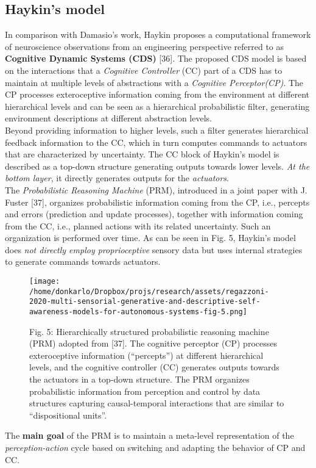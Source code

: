 \documentclass{article}
\begin{document}
		\subsection{Haykin’s model}
		In comparison with Damasio’s work, Haykin proposes a computational framework of neuroscience observations from an engineering perspective referred to as \textbf{Cognitive Dynamic
		Systems (CDS)} [36]. The proposed CDS model is based on the interactions that a \emph{Cognitive Controller} (CC) part of a CDS has to maintain at multiple levels of abstractions with a \emph{Cognitive Perceptor(CP)}.  The CP processes exteroceptive information coming from the environment at different hierarchical levels and can be seen as a hierarchical probabilistic filter, generating environment descriptions at different abstraction levels.
		\\
		Beyond providing information to higher levels, such a filter generates hierarchical feedback information to the CC, which in turn computes commands to actuators that are characterized
		by uncertainty. The CC block of Haykin’s model is described as a top-down structure generating outputs towards lower levels. \emph{At the bottom layer}, it directly generates outputs for
		the \emph{actuators}.
		\\
		The \emph{Probabilistic Reasoning Machine} (PRM), introduced in a joint paper with J. Fuster [37], organizes probabilistic information coming from the CP, i.e., percepts and errors (prediction and update processes), together with information coming from the CC, i.e., planned actions with its related
		uncertainty. Such an organization is performed over time. As can be seen in Fig. 5, Haykin’s model does \emph{not directly employ proprioceptive} sensory data but uses internal strategies
		to generate commands towards actuators.
		\begin{figure*}
			\centering
			\texttt{[image: /home/donkarlo/Dropbox/projs/research/assets/regazzoni-2020-multi-sensorial-generative-and-descriptive-self-awareness-models-for-autonomous-systems-fig-5.png]}
			\caption{Fig. 5: Hierarchically structured probabilistic reasoning machine (PRM) adopted from [37]. The cognitive perceptor (CP) processes exteroceptive information (“percepts”) at different hierarchical levels, and the cognitive controller (CC) generates outputs towards the actuators in a top-down structure. The PRM organizes probabilistic information from perception and control by data structures capturing causal-temporal interactions that are similar to “dispositional units”.
			}
			\label{fig:regazzoni-2020-multi-sensorial-generative-and-descriptive-self-awareness-models-for-autonomous-systems-fig-5.png}
		\end{figure*}
		The \textbf{main goal} of the PRM is to maintain a meta-level representation of the \emph{perception-action} cycle based on switching and adapting the behavior of CP and CC.
		
\end{document}
